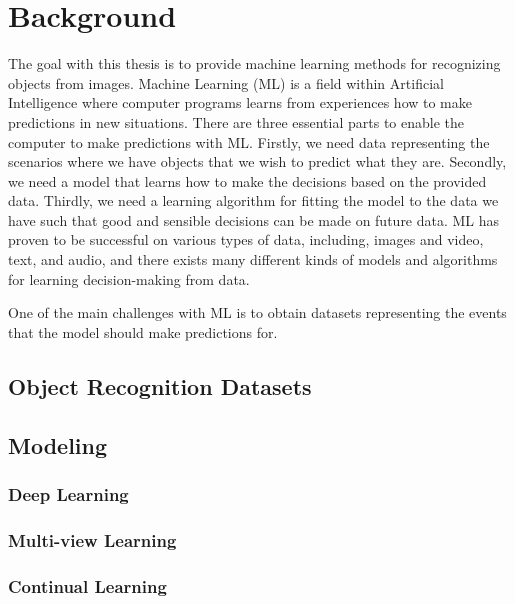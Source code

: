 
\chapter{Background}
\label{chap:background}

The goal with this thesis is to provide machine learning methods for recognizing objects from images. Machine Learning (ML) is a field within Artificial Intelligence where computer programs learns from experiences how to make predictions in new situations. There are three essential parts to enable the computer to make predictions with ML. Firstly, we need data representing the scenarios where we have objects that we wish to predict what they are. Secondly, we need a model that learns how to make the decisions based on the provided data. Thirdly, we need a learning algorithm for fitting the model to the data we have such that good and sensible decisions can be made on future data. ML has proven to be successful on various types of data, including, images and video, text, and audio, and there exists many different kinds of models and algorithms for learning decision-making from data. 

One of the main challenges with ML is to obtain datasets representing the events that the model should make predictions for. 





\section{Object Recognition Datasets}

\section{Modeling}

\subsection{Deep Learning}

\subsection{Multi-view Learning}

\subsection{Continual Learning}


